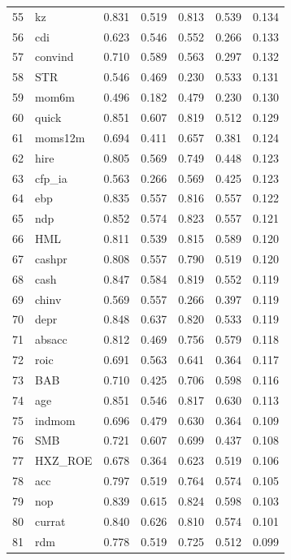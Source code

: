 \documentclass[12pt]{article}
\begin{document}
\begin{footnotesize}
\begin{longtable}{rl|c|c|c|c|c}
		55 & kz & 0.831 & 0.519 & 0.813 & 0.539 & 0.134 \\ 
		56 & cdi & 0.623 & 0.546 & 0.552 & 0.266 & 0.133 \\ 
		57 & convind & 0.710 & 0.589 & 0.563 & 0.297 & 0.132 \\ 
		58 & STR & 0.546 & 0.469 & 0.230 & 0.533 & 0.131 \\ 
		59 & mom6m & 0.496 & 0.182 & 0.479 & 0.230 & 0.130 \\ 
		60 & quick & 0.851 & 0.607 & 0.819 & 0.512 & 0.129 \\ 
		61 & moms12m & 0.694 & 0.411 & 0.657 & 0.381 & 0.124 \\ 
		62 & hire & 0.805 & 0.569 & 0.749 & 0.448 & 0.123 \\ 
		63 & cfp\_ia & 0.563 & 0.266 & 0.569 & 0.425 & 0.123 \\ 
		64 & ebp & 0.835 & 0.557 & 0.816 & 0.557 & 0.122 \\ 
		65 & ndp & 0.852 & 0.574 & 0.823 & 0.557 & 0.121 \\ 
		66 & HML & 0.811 & 0.539 & 0.815 & 0.589 & 0.120 \\ 
		67 & cashpr & 0.808 & 0.557 & 0.790 & 0.519 & 0.120 \\ 
		68 & cash & 0.847 & 0.584 & 0.819 & 0.552 & 0.119 \\ 
		69 & chinv & 0.569 & 0.557 & 0.266 & 0.397 & 0.119 \\ 
		70 & depr & 0.848 & 0.637 & 0.820 & 0.533 & 0.119 \\ 
		71 & absacc & 0.812 & 0.469 & 0.756 & 0.579 & 0.118 \\ 
		72 & roic & 0.691 & 0.563 & 0.641 & 0.364 & 0.117 \\ 
		73 & BAB & 0.710 & 0.425 & 0.706 & 0.598 & 0.116 \\ 
		74 & age & 0.851 & 0.546 & 0.817 & 0.630 & 0.113 \\ 
		75 & indmom & 0.696 & 0.479 & 0.630 & 0.364 & 0.109 \\ 
		76 & SMB & 0.721 & 0.607 & 0.699 & 0.437 & 0.108 \\ 
		77 & HXZ\_ROE & 0.678 & 0.364 & 0.623 & 0.519 & 0.106 \\ 
		78 & acc & 0.797 & 0.519 & 0.764 & 0.574 & 0.105 \\ 
		79 & nop & 0.839 & 0.615 & 0.824 & 0.598 & 0.103 \\ 
		80 & currat & 0.840 & 0.626 & 0.810 & 0.574 & 0.101 \\ 
		81 & rdm & 0.778 & 0.519 & 0.725 & 0.512 & 0.099 \\ 

\end{longtable}
\end{footnotesize}
\end{document}
